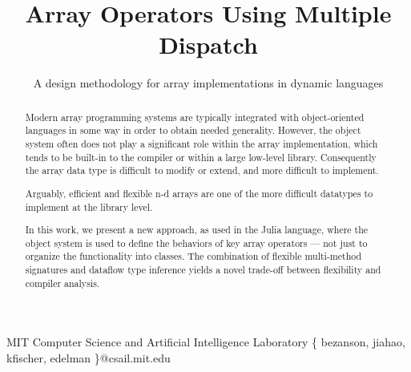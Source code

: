 \documentclass[preprint]{sigplanconf}
\begin{document}
\setlength{\pdfpageheight}{\paperheight}
\setlength{\pdfpagewidth}{\paperwidth}




\permissiontopublish             %



\title{Array Operators Using Multiple Dispatch}
\subtitle{ A design methodology for array implementations in dynamic languages }
           {MIT Computer Science and Artificial Intelligence Laboratory}
           {\{ bezanson, jiahao, kfischer, edelman \}@csail.mit.edu}


\maketitle

\begin{abstract}
Modern array programming systems are typically integrated with object-oriented
languages in some way in order to obtain needed generality. However, the
object system often does not play a significant role within the array
implementation, which tends to be built-in to the compiler or within a
large low-level library. Consequently the array data type is difficult to
modify or extend, and more difficult to implement.

Arguably, efficient
and flexible n-d arrays are one of the more difficult datatypes to implement
at the library level.

In this work, we present a new approach, as used in
the Julia language, where the object system is used to define the behaviors
of key array operators --- not just to organize the functionality into
classes.
The combination of flexible multi-method
signatures and dataflow type inference yields a novel trade-off between
flexibility and compiler analysis.
\end{abstract}
\end{document}
